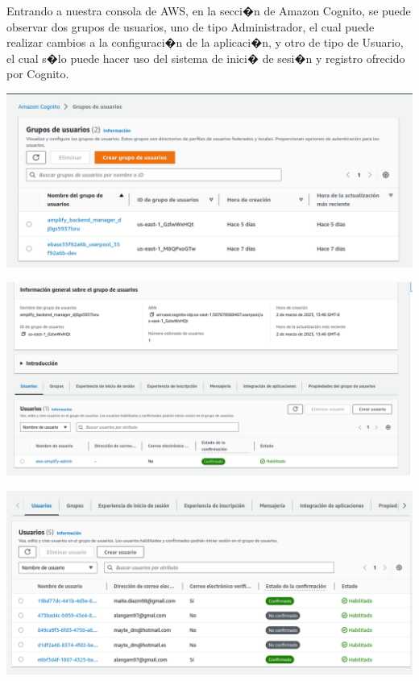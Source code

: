 \documentclass[12pt,letterpaper]{article}
\begin{document}
Entrando a nuestra consola de AWS, en la secci�n de Amazon Cognito, se puede observar dos grupos de usuarios, uno de tipo Administrador, el cual puede realizar cambios a la configuraci�n de la aplicaci�n, y otro de tipo de Usuario, el cual s�lo puede hacer uso del sistema de inici� de sesi�n y registro ofrecido por Cognito.

\begin{center}
  \includegraphics[scale=0.5]{imagenes/pools}
 \label{fig:cognito} 
\end{center} 

\begin{center}
  \includegraphics[scale=0.4]{imagenes/admin}
 \label{fig:cognito} 
\end{center} 

\begin{center}
  \includegraphics[scale=0.4]{imagenes/users}
 \label{fig:cognito} 
\end{center} 
\end{document}
